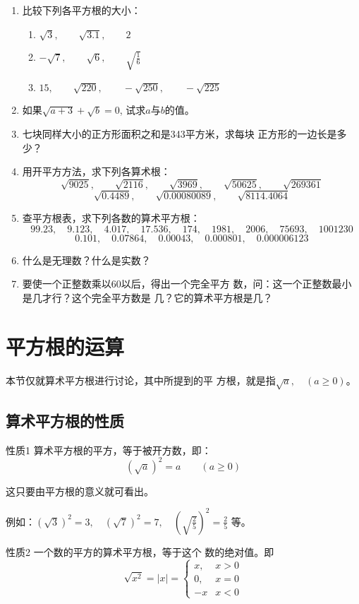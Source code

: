 \begin{enumerate}
\item 比较下列各平方根的大小：
\begin{enumerate}
    \item $\sqrt{3},\qquad \sqrt{3.1},\qquad 2$
    \item $-\sqrt{7},\qquad \sqrt{6},\qquad \sqrt{\frac{1}{6}}$
    \item $15,\qquad \sqrt{220},\qquad -\sqrt{250},\qquad -\sqrt{225}$
\end{enumerate}

\item 如果$\sqrt{a+3}+\sqrt{b}=0$, 试求$a$与$b$的值。
\item 七块同样大小的正方形面积之和是343平方米，求每块
正方形的一边长是多少？
\item 用开平方方法，求下列各算术根：
\[\sqrt{9025},\qquad \sqrt{2116},\qquad \sqrt{3969},\qquad \sqrt{50625},\qquad \sqrt{269361}\]
\[\sqrt{0.4489},\qquad \sqrt{0.00080089},\qquad \sqrt{8114.4064}\]
\item 查平方根表，求下列各数的算术平方根：
\[99.23,\quad 9.123,\quad 4.017,\quad 17.536,\quad 174,\quad 1981,\quad 2006,\quad 
75693,\quad 1001230\]
\[0.101,\quad 0.07864,\quad 0.00043,\quad 0.000801,\quad 
0.000006123\]
\item 什么是无理数？什么是实数？
\item 要使一个正整数乘以60以后，得出一个完全平方
数，问：这一个正整数最小是几才行？这个完全平方数是
几？它的算术平方根是几？
\end{enumerate}

\section{平方根的运算}
本节仅就算术平方根进行讨论，其中所提到的平
方根，就是指$\sqrt{a},\quad (a\ge 0)$。

\subsection{算术平方根的性质}

\begin{blk}{性质1}
    算术平方根的平方，等于被开方数，即：
$$\left(\sqrt{a}\right)^2=a\qquad (a\ge 0)$$
\end{blk}

这只要由平方根的意义就可看出。

例如：$(\sqrt{3})^2=3,\quad (\sqrt{7})^2=7,\quad \left(\sqrt{\frac{2}{5}}\right)^2=\frac{2}{5}$
等。

\begin{blk}{性质2}
    一个数的平方的算术平方根，等于这个
数的绝对值。即
\[\sqrt{x^2}=|x|=\begin{cases}
    x,& x>0\\
    0, &x=0\\
    -x & x<0
\end{cases}\]
\end{blk}

